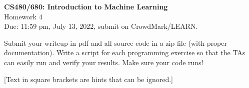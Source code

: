 \documentclass[10pt,letter,notitlepage]{article}
\newcounter{exercise}
\begin{document}
\begin{center}
\large{\textbf{CS480/680: Introduction to Machine Learning} \\ Homework 4\\ Due: 11:59 pm, July 13, 2022, submit on CrowdMark/LEARN.} \\


\end{center}

\begin{center}
Submit your writeup in pdf and all source code in a zip file (with proper documentation). Write a script for each programming exercise so that the TAs can easily run and verify your results. Make sure your code runs!

[Text in square brackets are hints that can be ignored.]
\end{center}
\end{document}
